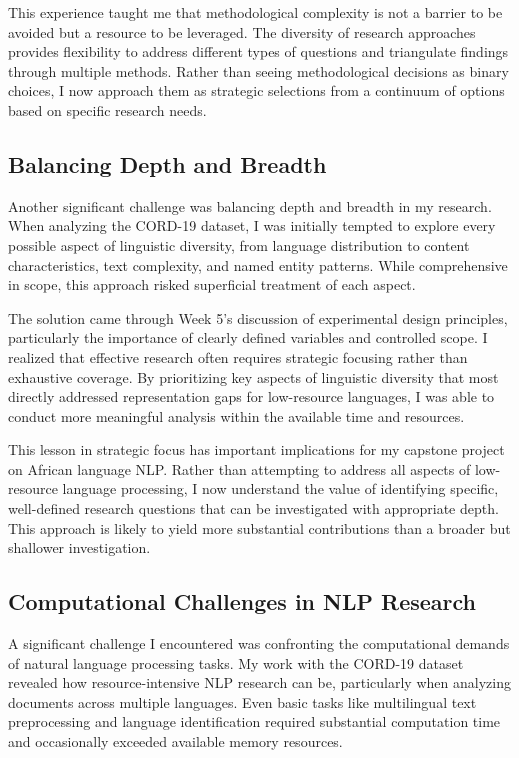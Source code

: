 \documentclass[
]{article}
\begin{document}
This experience taught me that methodological complexity is not a
barrier to be avoided but a resource to be leveraged. The diversity of
research approaches provides flexibility to address different types of
questions and triangulate findings through multiple methods. Rather than
seeing methodological decisions as binary choices, I now approach them
as strategic selections from a continuum of options based on specific
research needs.

\subsection{Balancing Depth and
Breadth}\label{balancing-depth-and-breadth}

Another significant challenge was balancing depth and breadth in my
research. When analyzing the CORD-19 dataset, I was initially tempted to
explore every possible aspect of linguistic diversity, from language
distribution to content characteristics, text complexity, and named
entity patterns. While comprehensive in scope, this approach risked
superficial treatment of each aspect.

The solution came through Week 5's discussion of experimental design
principles, particularly the importance of clearly defined variables and
controlled scope. I realized that effective research often requires
strategic focusing rather than exhaustive coverage. By prioritizing key
aspects of linguistic diversity that most directly addressed
representation gaps for low-resource languages, I was able to conduct
more meaningful analysis within the available time and resources.

This lesson in strategic focus has important implications for my
capstone project on African language NLP. Rather than attempting to
address all aspects of low-resource language processing, I now
understand the value of identifying specific, well-defined research
questions that can be investigated with appropriate depth. This approach
is likely to yield more substantial contributions than a broader but
shallower investigation.

\subsection{Computational Challenges in NLP
Research}\label{computational-challenges-in-nlp-research}

A significant challenge I encountered was confronting the computational
demands of natural language processing tasks. My work with the CORD-19
dataset revealed how resource-intensive NLP research can be,
particularly when analyzing documents across multiple languages. Even
basic tasks like multilingual text preprocessing and language
identification required substantial computation time and occasionally
exceeded available memory resources.
\end{document}

